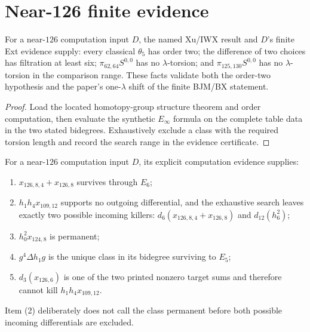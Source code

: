 \section{Near-126 finite evidence}

\begin{proposition}
  \label{evidence:theta5-order-torsion}
  \notready
  For a near-$126$ computation input $D$, the named Xu/IWX result and $D$'s
  finite Ext evidence supply: every classical
  $\theta_5$ has order two; the difference of two choices has filtration at
  least six; $\pi_{62,64}S^{0,0}$ has no $\lambda$-torsion; and
  $\pi_{125,130}S^{0,0}$ has no $\lambda$-torsion in the comparison range.
  These facts validate both the order-two hypothesis and the paper's
  one-$\lambda$ shift of the finite BJM/BX statement.
\end{proposition}

\begin{proof}
  Load the located homotopy-group structure theorem and order computation, then
  evaluate the synthetic $E_\infty$ formula on the complete table data in the
  two stated bidegrees.  Exhaustively exclude a class with the required
  torsion length and record the search range in the evidence certificate.
\end{proof}

\begin{proposition}
  \label{evidence:near126-core}
  \notready
  For a near-$126$ computation input $D$, its explicit computation evidence
  supplies:
  \begin{enumerate}
    \item $x_{126,8,4}+x_{126,8}$ survives through $E_6$;
    \item $h_1h_4x_{109,12}$ supports no outgoing differential, and the
      exhaustive search leaves exactly two possible incoming killers:
      $d_6(x_{126,8,4}+x_{126,8})$ and $d_{12}(h_6^2)$;
    \item $h_0^2x_{124,8}$ is permanent;
    \item $g^4\Delta h_1g$ is the unique class in its bidegree surviving to
      $E_5$;
    \item $d_3(x_{126,6})$ is one of the two printed nonzero target sums and
      therefore cannot kill $h_1h_4x_{109,12}$.
  \end{enumerate}
  Item (2) deliberately does not call the class permanent before both possible
  incoming differentials are excluded.
\end{proposition}

